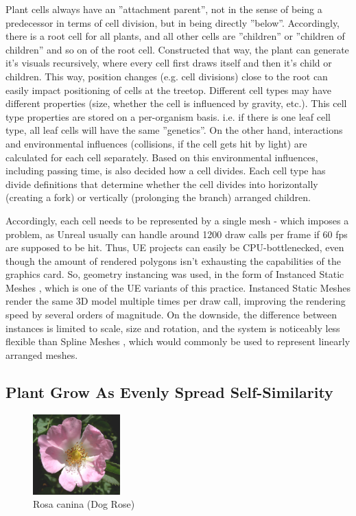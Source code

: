 \documentclass[11pt]{scrartcl}
\begin{document}
Plant cells always have an ''attachment parent'', not in the sense of being a predecessor in terms of cell division, but in being directly ''below''. Accordingly, there is a root cell for all plants, and all other cells are ''children'' or ''children of children'' and so on of the root cell. Constructed that way, the plant can generate it's visuals recursively, where every cell first draws itself and then it's child or children. This way, position changes (e.g. cell divisions) close to the root can easily impact positioning of cells at the treetop. Different cell types may have different properties (size, whether the cell is influenced by gravity, etc.). This cell type properties are stored on a per-organism basis. i.e. if there is one leaf cell type, all leaf cells will have the same ''genetics''. On the other hand, interactions and environmental influences (collisions, if the cell gets hit by light) are calculated for each cell separately. Based on this environmental influences, including passing time, is also decided how a cell divides. Each cell type has divide definitions that determine whether the cell divides into horizontally (creating a fork) or vertically (prolonging the branch) arranged children.

Accordingly, each cell needs to be represented by a single mesh - which imposes a problem, as Unreal usually can handle around 1200 draw calls per frame if 60 fps are supposed to be hit. Thus, UE projects can easily be CPU-bottlenecked, even though the amount of rendered polygons isn't exhausting the capabilities of the graphics card. So, geometry instancing was used, in the form of Instanced Static Meshes \cite{UEInstancing}, which is one of the UE variants of this practice. Instanced Static Meshes render the same 3D model multiple times per draw call, improving the rendering speed by several orders of magnitude. On the downside, the difference between instances is limited to scale, size and rotation, and the system is noticeably less flexible than Spline Meshes \cite{UESplines}, which would commonly be used to represent linearly arranged meshes.

\subsection{Plant Grow As Evenly Spread Self-Similarity} \label{cpt:EvenSelfSim}

\begin{figure} 
 	\centering
 		\includegraphics[width=0.3\textwidth]{Pic_DogRose.png}
 	\caption{Rosa canina (Dog Rose)  \cite{WikipediaDogRose}}
 	\label{fig:DogRose}
\end{figure}
\end{document}
